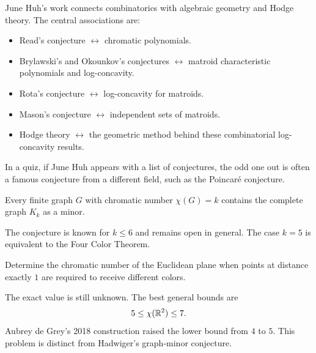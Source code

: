     \begin{fact}
        June Huh's work connects combinatorics with algebraic geometry and Hodge
        theory. The central associations are:
        \begin{itemize}
            \item Read's conjecture $\leftrightarrow$ chromatic polynomials.
            \item Brylawski's and Okounkov's conjectures
                  $\leftrightarrow$ matroid characteristic polynomials and
                  log-concavity.
            \item Rota's conjecture $\leftrightarrow$ log-concavity for matroids.
            \item Mason's conjecture $\leftrightarrow$ independent sets of matroids.
            \item Hodge theory $\leftrightarrow$ the geometric method behind these
                  combinatorial log-concavity results.
        \end{itemize}
        In a quiz, if June Huh appears with a list of conjectures, the odd one
        out is often a famous conjecture from a different field, such as the
        Poincaré conjecture.
    \end{fact}

    \begin{conjecture}
        Every finite graph $G$ with chromatic number $\chi(G)=k$ contains the
        complete graph $K_k$ as a minor.
    \end{conjecture}

    \begin{remark}
        The conjecture is known for $k\leq 6$ and remains open in general. The
        case $k=5$ is equivalent to the Four Color Theorem.
    \end{remark}

    \begin{openproblem}
        Determine the chromatic number of the Euclidean plane when points at
        distance exactly $1$ are required to receive different colors.
    \end{openproblem}

    \begin{remark}
        The exact value is still unknown. The best general bounds are
        \[
            5\leq \chi(\mathbb{R}^2)\leq 7.
        \]
        Aubrey de Grey's 2018 construction raised the lower bound from $4$ to
        $5$. This problem is distinct from Hadwiger's graph-minor conjecture.
    \end{remark}

